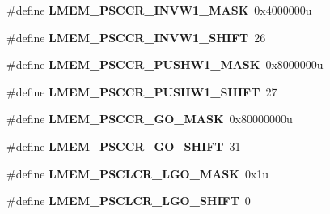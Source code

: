 \begin{DoxyCompactItemize}
\item 
\hypertarget{group___l_m_e_m___register___masks_gaa790b713d5bd26a8431abf9d6ef5edbd}{}\#define {\bfseries L\+M\+E\+M\+\_\+\+P\+S\+C\+C\+R\+\_\+\+I\+N\+V\+W1\+\_\+\+M\+A\+S\+K}~0x4000000u\label{group___l_m_e_m___register___masks_gaa790b713d5bd26a8431abf9d6ef5edbd}

\item 
\hypertarget{group___l_m_e_m___register___masks_gab253c9f8e33825808f7a8de79b116aca}{}\#define {\bfseries L\+M\+E\+M\+\_\+\+P\+S\+C\+C\+R\+\_\+\+I\+N\+V\+W1\+\_\+\+S\+H\+I\+F\+T}~26\label{group___l_m_e_m___register___masks_gab253c9f8e33825808f7a8de79b116aca}

\item 
\hypertarget{group___l_m_e_m___register___masks_ga209b6a885eea67f97ad2374587975726}{}\#define {\bfseries L\+M\+E\+M\+\_\+\+P\+S\+C\+C\+R\+\_\+\+P\+U\+S\+H\+W1\+\_\+\+M\+A\+S\+K}~0x8000000u\label{group___l_m_e_m___register___masks_ga209b6a885eea67f97ad2374587975726}

\item 
\hypertarget{group___l_m_e_m___register___masks_ga98849f4ce477066209f0a3aa385016ed}{}\#define {\bfseries L\+M\+E\+M\+\_\+\+P\+S\+C\+C\+R\+\_\+\+P\+U\+S\+H\+W1\+\_\+\+S\+H\+I\+F\+T}~27\label{group___l_m_e_m___register___masks_ga98849f4ce477066209f0a3aa385016ed}

\item 
\hypertarget{group___l_m_e_m___register___masks_ga4ca3d67ff99bbe390d8df7ec1ab4b84c}{}\#define {\bfseries L\+M\+E\+M\+\_\+\+P\+S\+C\+C\+R\+\_\+\+G\+O\+\_\+\+M\+A\+S\+K}~0x80000000u\label{group___l_m_e_m___register___masks_ga4ca3d67ff99bbe390d8df7ec1ab4b84c}

\item 
\hypertarget{group___l_m_e_m___register___masks_ga27539e6de05cb8bf535d010aa18752f2}{}\#define {\bfseries L\+M\+E\+M\+\_\+\+P\+S\+C\+C\+R\+\_\+\+G\+O\+\_\+\+S\+H\+I\+F\+T}~31\label{group___l_m_e_m___register___masks_ga27539e6de05cb8bf535d010aa18752f2}

\item 
\hypertarget{group___l_m_e_m___register___masks_ga48bc5bb098e21a0e5b4e486f24379e62}{}\#define {\bfseries L\+M\+E\+M\+\_\+\+P\+S\+C\+L\+C\+R\+\_\+\+L\+G\+O\+\_\+\+M\+A\+S\+K}~0x1u\label{group___l_m_e_m___register___masks_ga48bc5bb098e21a0e5b4e486f24379e62}

\item 
\hypertarget{group___l_m_e_m___register___masks_ga40b12346b0b163ac45eeffd047f6fcc1}{}\#define {\bfseries L\+M\+E\+M\+\_\+\+P\+S\+C\+L\+C\+R\+\_\+\+L\+G\+O\+\_\+\+S\+H\+I\+F\+T}~0\label{group___l_m_e_m___register___masks_ga40b12346b0b163ac45eeffd047f6fcc1}


\end{DoxyCompactItemize}
